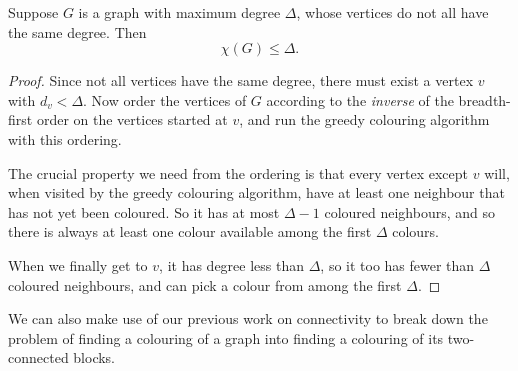 \documentclass[nobib]{tufte-handout}
\begin{document}
\begin{lemma}\label{lemma:brooks_for_irregular}
  Suppose $G$ is a graph with maximum degree $\Delta$, whose vertices do not all have the same degree. Then
  $$\chi(G) \leq \Delta.$$

  \begin{proof}
    Since not all vertices have the same degree, there must exist a vertex $v$ with $d_v < \Delta$. Now order the vertices of $G$ according to the \emph{inverse} of the breadth-first order on the vertices started at $v$, and run the greedy colouring algorithm with this ordering.

    The crucial property we need from the ordering is that every vertex except $v$ will, when visited by the greedy colouring algorithm, have at least one neighbour that has not yet been coloured. So it has at most $\Delta - 1$ coloured neighbours, and so there is always at least one colour available among the first $\Delta$ colours.

    When we finally get to $v$, it has degree less than $\Delta$, so it too has fewer than $\Delta$ coloured neighbours, and can pick a colour from among the first $\Delta$.
  \end{proof}
\end{lemma}

We can also make use of our previous work on connectivity to break down the problem of finding a colouring of a graph into finding a colouring of its two-connected blocks.
\end{document}
